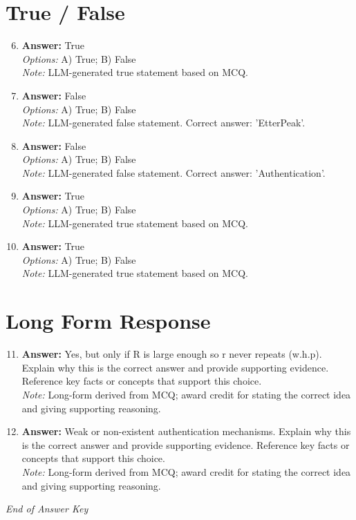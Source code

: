 \documentclass[12pt]{article}
\begin{document}
\section*{True / False}
\begin{enumerate}[label=\arabic*.]
\setcounter{enumi}{5}
\item \textbf{Answer:} True
\\ \textit{Options:} A) True; B) False
\\ \textit{Note:} LLM-generated true statement based on MCQ.
\item \textbf{Answer:} False
\\ \textit{Options:} A) True; B) False
\\ \textit{Note:} LLM-generated false statement. Correct answer: 'EtterPeak'.
\item \textbf{Answer:} False
\\ \textit{Options:} A) True; B) False
\\ \textit{Note:} LLM-generated false statement. Correct answer: 'Authentication'.
\item \textbf{Answer:} True
\\ \textit{Options:} A) True; B) False
\\ \textit{Note:} LLM-generated true statement based on MCQ.
\item \textbf{Answer:} True
\\ \textit{Options:} A) True; B) False
\\ \textit{Note:} LLM-generated true statement based on MCQ.
\end{enumerate}

\section*{Long Form Response}
\begin{enumerate}[label=\arabic*.]
\setcounter{enumi}{10}
\item \textbf{Answer:} Yes, but only if R is large enough so r never repeats (w.h.p). Explain why this is the correct answer and provide supporting evidence. Reference key facts or concepts that support this choice.
\\ \textit{Note:} Long-form derived from MCQ; award credit for stating the correct idea and giving supporting reasoning.
\item \textbf{Answer:} Weak or non-existent authentication mechanisms. Explain why this is the correct answer and provide supporting evidence. Reference key facts or concepts that support this choice.
\\ \textit{Note:} Long-form derived from MCQ; award credit for stating the correct idea and giving supporting reasoning.
\end{enumerate}

\vfill
\noindent\textit{End of Answer Key}
\end{document}
